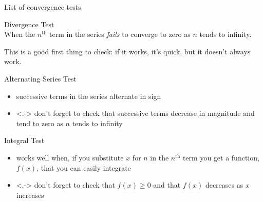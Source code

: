\begin{frame}[t]{List of convergence tests}
\begin{Ldescription}[<+->]
\item[Divergence Test]$ $\\
When the $n^{\mathrm{th}}$ term in the series \textit{fails}
to converge to zero as $n$ tends to infinity.

This is a good first thing to check: if it works, it's quick, but it doesn't always work.
\vfill
\item[Alternating Series Test]$ $\\
\begin{itemize}
\item
successive terms in the series alternate
in sign
\item<.->
don't forget to check that successive terms decrease in magnitude
and tend to zero as $n$  tends to infinity
\end{itemize}
\vfill
\item[Integral Test]$ $\\
\begin{itemize}
\item
works well when, if you substitute $x$ for $n$ in the $n^{\mathrm{th}}$ term
you get a function, $f(x)$, that you can easily integrate
\item<.->
don't forget to check that $f(x)\ge 0$ and that $f(x)$ decreases
as $x$ increases
\end{itemize}
\end{Ldescription}
\end{frame}
